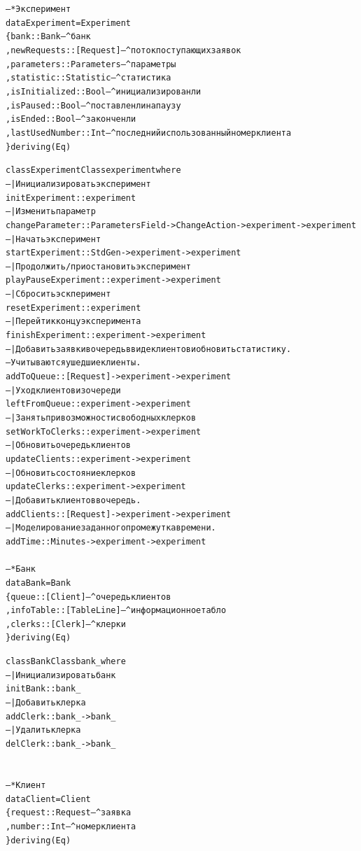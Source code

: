 \documentclass[oneside,final,12pt]{article}
\begin{document}
\begin{alltt}
-- * Эксперимент
data Experiment = Experiment
\{ bank           :: Bank       -- ^ банк
	, newRequests    :: [Request]  -- ^ поток поступающих заявок
	, parameters     :: Parameters -- ^ параметры
	, statistic      :: Statistic  -- ^ статистика
	, isInitialized  :: Bool       -- ^ инициализирован ли
	, isPaused       :: Bool       -- ^ поставлен ли на паузу
	, isEnded        :: Bool       -- ^ закончен ли
	, lastUsedNumber :: Int        -- ^ последний использованный номер клиента
\} deriving (Eq)

class ExperimentClass experiment where
-- | Инициализировать эксперимент
initExperiment      :: experiment
-- | Изменить параметр
changeParameter     :: ParametersField -> ChangeAction -> experiment -> experiment
-- | Начать эксперимент
startExperiment     :: StdGen -> experiment -> experiment
-- | Продолжить/приостановить эксперимент
playPauseExperiment :: experiment -> experiment
-- | Сбросить эскперимент
resetExperiment     :: experiment
-- | Перейти к концу эксперимента
finishExperiment    :: experiment -> experiment
-- | Добавить заявки в очередь в виде клиентов и обновить статистику.
-- Учитываются ушедшие клиенты.
addToQueue          :: [Request] -> experiment -> experiment
-- | Уход клиентов из очереди
leftFromQueue       :: experiment -> experiment
-- | Занять при возможности свободных клерков
setWorkToClerks     :: experiment -> experiment
-- | Обновить очередь клиентов
updateClients       :: experiment -> experiment
-- | Обновить состояние клерков
updateClerks        :: experiment -> experiment
-- | Добавить клиентов в очередь.
addClients          :: [Request] -> experiment -> experiment
-- | Моделирование заданного промежутка времени.
addTime             :: Minutes -> experiment -> experiment
 \\\\
-- * Банк
data Bank = Bank
\{ queue     :: [Client]    -- ^ очередь клиентов
	, infoTable :: [TableLine] -- ^ информационное табло
	, clerks    :: [Clerk]     -- ^ клерки
\} deriving (Eq)

class BankClass bank_ where
-- | Инициализировать банк
initBank :: bank_
-- | Добавить клерка
addClerk :: bank_ -> bank_
-- | Удалить клерка
delClerk :: bank_ -> bank_
 \\\\\\
-- * Клиент
data Client = Client
\{ request      :: Request -- ^ заявка
	, number       :: Int     -- ^ номер клиента
\} deriving (Eq)


\end{alltt}
\end{document}
